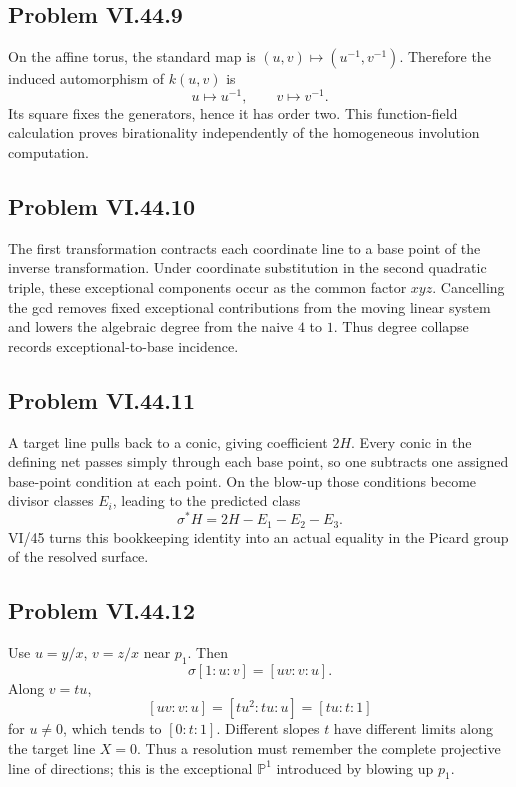 \subsection*{Problem VI.44.9}
\begin{solution}
On the affine torus, the standard map is \((u,v)\mapsto(u^{-1},v^{-1})\).  Therefore the induced automorphism of \(k(u,v)\) is
\[
u\mapsto u^{-1},\qquad v\mapsto v^{-1}.
\]
Its square fixes the generators, hence it has order two.  This function-field calculation proves birationality independently of the homogeneous involution computation.
\end{solution}

\subsection*{Problem VI.44.10}
\begin{solution}
The first transformation contracts each coordinate line to a base point of the inverse transformation.  Under coordinate substitution in the second quadratic triple, these exceptional components occur as the common factor \(xyz\).  Cancelling the gcd removes fixed exceptional contributions from the moving linear system and lowers the algebraic degree from the naive \(4\) to \(1\).  Thus degree collapse records exceptional-to-base incidence.
\end{solution}

\subsection*{Problem VI.44.11}
\begin{solution}
A target line pulls back to a conic, giving coefficient \(2H\).  Every conic in the defining net passes simply through each base point, so one subtracts one assigned base-point condition at each point.  On the blow-up those conditions become divisor classes \(E_i\), leading to the predicted class
\[
\sigma^*H=2H-E_1-E_2-E_3.
\]
VI/45 turns this bookkeeping identity into an actual equality in the Picard group of the resolved surface.
\end{solution}

\subsection*{Problem VI.44.12}
\begin{solution}
Use \(u=y/x\), \(v=z/x\) near \(p_1\).  Then
\[
\sigma[1:u:v]=[uv:v:u].
\]
Along \(v=tu\),
\[
[uv:v:u]=[tu^2:tu:u]=[tu:t:1]
\]
for \(u\neq0\), which tends to \([0:t:1]\).  Different slopes \(t\) have different limits along the target line \(X=0\).  Thus a resolution must remember the complete projective line of directions; this is the exceptional \(\mathbb P^1\) introduced by blowing up \(p_1\).
\end{solution}

